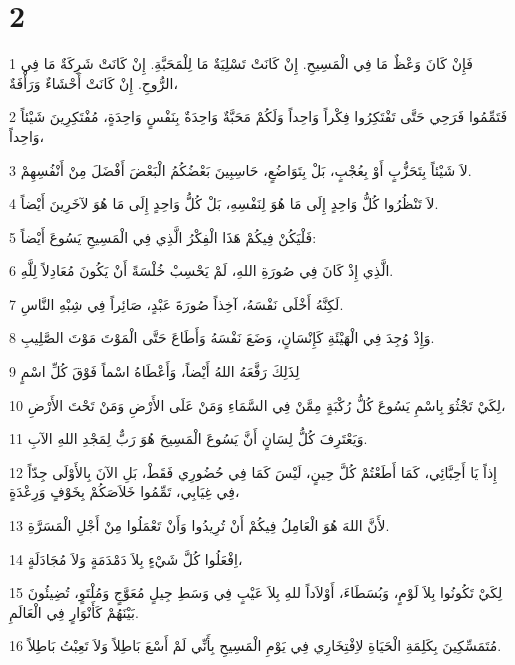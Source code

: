 \chapter{2}

\par 1 فَإِنْ كَانَ وَعْظٌ مَا فِي الْمَسِيحِ. إِنْ كَانَتْ تَسْلِيَةٌ مَا لِلْمَحَبَّةِ. إِنْ كَانَتْ شَرِكَةٌ مَا فِي الرُّوحِ. إِنْ كَانَتْ أَحْشَاءٌ وَرَأْفَةٌ،
\par 2 فَتَمِّمُوا فَرَحِي حَتَّى تَفْتَكِرُوا فِكْراً وَاحِداً وَلَكُمْ مَحَبَّةٌ وَاحِدَةٌ بِنَفْسٍ وَاحِدَةٍ، مُفْتَكِرِينَ شَيْئاً وَاحِداً،
\par 3 لاَ شَيْئاً بِتَحَزُّبٍ أَوْ بِعُجْبٍ، بَلْ بِتَوَاضُعٍ، حَاسِبِينَ بَعْضُكُمُ الْبَعْضَ أَفْضَلَ مِنْ أَنْفُسِهِمْ.
\par 4 لاَ تَنْظُرُوا كُلُّ وَاحِدٍ إِلَى مَا هُوَ لِنَفْسِهِ، بَلْ كُلُّ وَاحِدٍ إِلَى مَا هُوَ لآخَرِينَ أَيْضاً.
\par 5 فَلْيَكُنْ فِيكُمْ هَذَا الْفِكْرُ الَّذِي فِي الْمَسِيحِ يَسُوعَ أَيْضاً:
\par 6 الَّذِي إِذْ كَانَ فِي صُورَةِ اللهِ، لَمْ يَحْسِبْ خُلْسَةً أَنْ يَكُونَ مُعَادِلاً لِلَّهِ.
\par 7 لَكِنَّهُ أَخْلَى نَفْسَهُ، آخِذاً صُورَةَ عَبْدٍ، صَائِراً فِي شِبْهِ النَّاسِ.
\par 8 وَإِذْ وُجِدَ فِي الْهَيْئَةِ كَإِنْسَانٍ، وَضَعَ نَفْسَهُ وَأَطَاعَ حَتَّى الْمَوْتَ مَوْتَ الصَّلِيبِ.
\par 9 لِذَلِكَ رَفَّعَهُ اللهُ أَيْضاً، وَأَعْطَاهُ اسْماً فَوْقَ كُلِّ اسْمٍ
\par 10 لِكَيْ تَجْثُوَ بِاسْمِ يَسُوعَ كُلُّ رُكْبَةٍ مِمَّنْ فِي السَّمَاءِ وَمَنْ عَلَى الأَرْضِ وَمَنْ تَحْتَ الأَرْضِ،
\par 11 وَيَعْتَرِفَ كُلُّ لِسَانٍ أَنَّ يَسُوعَ الْمَسِيحَ هُوَ رَبٌّ لِمَجْدِ اللهِ الآبِ.
\par 12 إِذاً يَا أَحِبَّائِي، كَمَا أَطَعْتُمْ كُلَّ حِينٍ، لَيْسَ كَمَا فِي حُضُورِي فَقَطْ، بَلِ الآنَ بِالأَوْلَى جِدّاً فِي غِيَابِي، تَمِّمُوا خَلاَصَكُمْ بِخَوْفٍ وَرِعْدَةٍ،
\par 13 لأَنَّ اللهَ هُوَ الْعَامِلُ فِيكُمْ أَنْ تُرِيدُوا وَأَنْ تَعْمَلُوا مِنْ أَجْلِ الْمَسَرَّةِ.
\par 14 اِفْعَلُوا كُلَّ شَيْءٍ بِلاَ دَمْدَمَةٍ وَلاَ مُجَادَلَةٍ،
\par 15 لِكَيْ تَكُونُوا بِلاَ لَوْمٍ، وَبُسَطَاءَ، أَوْلاَداً للهِ بِلاَ عَيْبٍ فِي وَسَطِ جِيلٍ مُعَوَّجٍ وَمُلْتَوٍ، تُضِيئُونَ بَيْنَهُمْ كَأَنْوَارٍ فِي الْعَالَمِ.
\par 16 مُتَمَسِّكِينَ بِكَلِمَةِ الْحَيَاةِ لاِفْتِخَارِي فِي يَوْمِ الْمَسِيحِ بِأَنِّي لَمْ أَسْعَ بَاطِلاً وَلاَ تَعِبْتُ بَاطِلاً.
